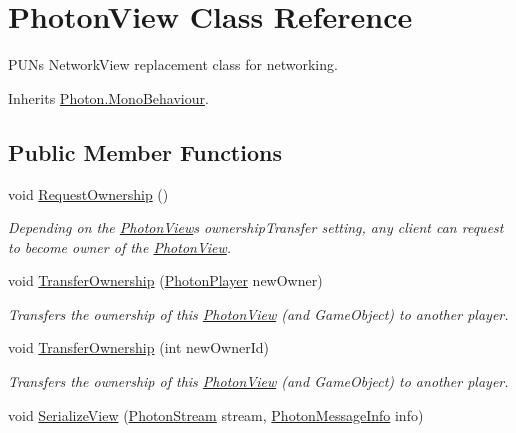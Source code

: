 \hypertarget{class_photon_view}{}\section{Photon\+View Class Reference}
\label{class_photon_view}


P\+UN\textquotesingle{}s Network\+View replacement class for networking.  




Inherits \hyperlink{class_photon_1_1_mono_behaviour}{Photon.\+Mono\+Behaviour}.

\subsection*{Public Member Functions}
\begin{DoxyCompactItemize}
\item 
void \hyperlink{class_photon_view_a0eee05bdd9c48c263a41ccfec45b8651}{Request\+Ownership} ()
\begin{DoxyCompactList}\small\item\em Depending on the \hyperlink{class_photon_view}{Photon\+View}\textquotesingle{}s ownership\+Transfer setting, any client can request to become owner of the \hyperlink{class_photon_view}{Photon\+View}. \end{DoxyCompactList}\item 
void \hyperlink{class_photon_view_a484df6eca8208330c00c317334dd8115}{Transfer\+Ownership} (\hyperlink{class_photon_player}{Photon\+Player} new\+Owner)
\begin{DoxyCompactList}\small\item\em Transfers the ownership of this \hyperlink{class_photon_view}{Photon\+View} (and Game\+Object) to another player. \end{DoxyCompactList}\item 
void \hyperlink{class_photon_view_ad892c308b04787c06907120e64f6bc03}{Transfer\+Ownership} (int new\+Owner\+Id)
\begin{DoxyCompactList}\small\item\em Transfers the ownership of this \hyperlink{class_photon_view}{Photon\+View} (and Game\+Object) to another player. \end{DoxyCompactList}\item 
void \hyperlink{class_photon_view_af1871faa617868760d00e59d443d2ad8}{Serialize\+View} (\hyperlink{class_photon_stream}{Photon\+Stream} stream, \hyperlink{class_photon_message_info}{Photon\+Message\+Info} info)
\item 

\end{DoxyCompactItemize}
